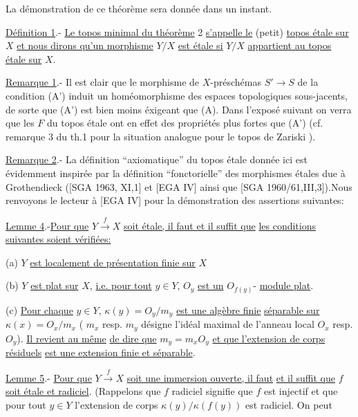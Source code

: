 La démonstration de ce théorème sera donnée dans un instant.

\uline{Définition 1}.- \uline{Le topos minimal du théorème} 2 \uline{s'appelle le}
(petit) \uline{topos étale sur} $X$ \uline{et nous dirons qu'un morphisme} $Y/X$
\uline{est étale si} $Y/X$ \uline{appartient au topos étale sur} $X$.

\uline{Remarque 1}.- Il est clair que le morphisme de $X$-préschémas
$S'\longrightarrow S$ de la condition (A') induit un homéomorphisme des espaces
topologiques sous-jacents, de sorte que (A') est bien moins
éxigeant que (A). Dans l'exposé suivant on verra que les $F$ du
topos étale ont en effet des propriétés  plus fortes que (A')
(cf. remarque 3 du th.1 pour la situation analogue pour le topos
de Zariski ).

\uline{Remarque 2}.- La définition ``axiomatique'' du topos étale donnée
ici est évidemment inspirée par la définition ``fonctorielle''
des morphismes étales due à Grothendieck ([SGA 1963, XI,1] et
[EGA IV\qquad] ainsi que [SGA 1960/61,III,3]).Nous renvoyons
le lecteur à [EGA IV\qquad] pour la démonstration des assertions
suivantes:

\uline{Lemme 4}.-\uline{Pour que} $Y\xrightarrow{f}X$ \uline{soit étale, il faut et il suffit que}
\uline{les conditions suivantes soient vérifiées:}

(a) $Y$ \uline{est localement de présentation finie sur} $X$

(b) $Y$ \uline{est plat sur} $X$, \uline{i.e. pour tout} $y\in Y$, $O_y$ \uline{est un} $O_{f(y)}$-
\uline{module plat}.

(c) \uline{Pour chaque} $y\in Y$, $\kappa(y)=O_y/m_y$ \uline{est une algèbre finie}
\uline{séparable sur} $\kappa(x)=O_x/m_x$ ( $m_x$ resp. $m_y$ désigne l'idéal
maximal de l'anneau local $O_x$ resp. $O_y$). \uline{Il revient au même}
\uline{de dire que} $m_y=m_xO_y$ \uline{et que l'extension de corps résiduels} 
\uline{est une extension finie et séparable}.

\uline{Lemme 5}.- \uline{Pour que} $Y\xrightarrow{f}X$ \uline{soit une immersion ouverte, il faut}
\uline{et il suffit que} $f$ \uline{soit étale et radiciel}. (Rappelons que $f$
radiciel signifie que $f$ est injectif et que pour tout $y\in Y$
l'extension de corps $\kappa(y)/\kappa(f(y))$ est radiciel. On peut
